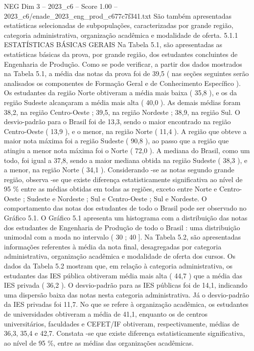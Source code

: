 \begin{textsample}{NEG Dim 3 – 2023\_c6 – Score 1.00 – 2023\_c6/enade\_2023\_eng\_prod\_c677c7f341.txt}
São também apresentadas estatísticas selecionadas de subpopulações, caracterizadas por grande região, categoria administrativa, organização acadêmica e modalidade de oferta. 5.1.1 ESTATÍSTICAS BÁSICAS GERAIS Na Tabela 5.1, são apresentadas as estatísticas básicas da prova, por grande região, dos estudantes concluintes de Engenharia de Produção.
Como se pode verificar, a partir dos dados mostrados na Tabela 5.1, a média das notas da prova foi de 39,5 ( nas seções seguintes serão analisados os componentes de Formação Geral e de Conhecimento Específico ).
Os estudantes da região Norte obtiveram a média mais baixa ( 35,8 ), e os da região Sudeste alcançaram a média mais alta ( 40,0 ).
As demais médias foram 38,2, na região Centro-Oeste ; 39,5, na região Nordeste ; 38,9, na região Sul.
O desvio-padrão para o Brasil foi de 13,3, sendo o maior encontrado na região Centro-Oeste ( 13,9 ), e o menor, na região Norte ( 11,4 ).
A região que obteve a maior nota máxima foi a região Sudeste ( 90,8 ), ao passo que a região que atingiu a menor nota máxima foi o Norte ( 72,0 ).
A mediana do Brasil, como um todo, foi igual a 37,8, sendo a maior mediana obtida na região Sudeste ( 38,3 ), e a menor, na região Norte ( 34,1 ).
Considerando -se as notas segundo grande região, observa -se que existe diferença estatisticamente significativa ao nível de 95 \% entre as médias obtidas em todas as regiões, exceto entre Norte e Centro-Oeste ; Sudeste e Nordeste ; Sul e Centro-Oeste ; Sul e Nordeste.
O comportamento das notas dos estudantes de todo o Brasil pode ser observado no Gráfico 5.1.
O Gráfico 5.1 apresenta um histograma com a distribuição das notas dos estudantes de Engenharia de Produção de todo o Brasil : uma distribuição unimodal com a moda no intervalo ( 30 ; 40 ].
Na Tabela 5.2, são apresentadas informações referentes à média da nota final, desagregadas por categoria administrativa, organização acadêmica e modalidade de oferta dos cursos.
Os dados da Tabela 5.2 mostram que, em relação à categoria administrativa, os estudantes das IES pública obtiveram média mais alta ( 44,7 ) que a média das IES privada ( 36,2 ).
O desvio-padrão para as IES públicas foi de 14,1, indicando uma dispersão baixa das notas nesta categoria administrativa.
Já o desvio-padrão da IES privadas foi 11,7.
No que se refere à organização acadêmica, os estudantes de universidades obtiveram a média de 41,1, enquanto os de centros universitários, faculdades e CEFET/IF obtiveram, respectivamente, médias de 36,3, 35,4 e 42,7.
Constata -se que existe diferença estatisticamente significativa, ao nível de 95 \%, entre as médias das organizações acadêmicas.

\end{textsample}
